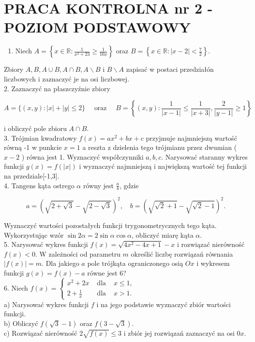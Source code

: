 \documentclass[10pt]{article}
\begin{document}
\section*{PRACA KONTROLNA nr 2 - POZIOM PODSTAWOWY}
\begin{enumerate}
  \item Niech $A=\left\{x \in \mathbb{R}: \frac{1}{x^{2}+23} \geqslant \frac{1}{10 x}\right\}$ oraz $B=\left\{x \in \mathbb{R}:|x-2|<\frac{7}{2}\right\}$.
\end{enumerate}

Zbiory $A, B, A \cup B, A \cap B, A \backslash B$ i $B \backslash A$ zapisać w postaci przedziałón liczbowych i zaznaczyć je na osi liczbowej.\\
2. Zaznaczyć na płaszczyźnie zbiory

$$
A=\{(x, y):|x|+|y| \leqslant 2\} \quad \text { oraz } \quad B=\left\{(x, y): \frac{1}{|x-1|} \leqslant \frac{1}{|x+3|}, \frac{2}{|y-1|} \geqslant 1\right\}
$$

i obliczyć pole zbioru $A \cap B$.\\
3. Trójmian kwadratowy $f(x)=a x^{2}+b x+c$ przyjmuje najmniejszą wartość równą -1 w punkcie $x=1$ a reszta z dzielenia tego trójmianu przez dwumian ( $x-2$ ) równa jest 1. Wyznaczyć współczynniki $a, b, c$. Narysować staranny wykres funkcji $g(x)=f(|x|)$ i wyznaczyć najmniejszą i największą wartość tej funkcji na przedziale[-1,3].\\
4. Tangens kąta ostrego $\alpha$ równy jest $\frac{a}{b}$, gdzie

$$
a=(\sqrt{2+\sqrt{3}}-\sqrt{2-\sqrt{3}})^{2}, \quad b=(\sqrt{\sqrt{2}+1}-\sqrt{\sqrt{2}-1})^{2} .
$$

Wyznaczyć wartości pozostałych funkcji trygonometrycznych tego kąta. Wykorzystując wzór $\sin 2 \alpha=2 \sin \alpha \cos \alpha$, obliczyć miarę kąta $\alpha$.\\
5. Narysować wykres funkcji $f(x)=\sqrt{4 x^{2}-4 x+1}-x$ i rozwiązać nierówność $f(x)<0$. W zależności od parametru $m$ określić liczbę rozwiązań równania $|f(x)|=m$. Dla jakiego $a$ pole trójkąta ograniczonego osią $O x$ i wykresem funkcji $g(x)=f(x)-a$ równe jest 6?\\
6. Niech $f(x)=\left\{\begin{array}{rll}x^{2}+2 x & \text { dla } & x \leqslant 1, \\ 2+\frac{1}{x} & \text { dla } & x>1 .\end{array}\right.$\\
a) Narysować wykres funkcji $f$ i na jego podstawie wyznaczyć zbiór wartości funkcji.\\
b) Obliczyć $f(\sqrt{3}-1)$ oraz $f(3-\sqrt{3})$.\\
c) Rozwiązać nierówność $2 \sqrt{f(x)} \leqslant 3$ i zbiór jej rozwiązań zaznaczyć na osi $0 x$.
\end{document}
